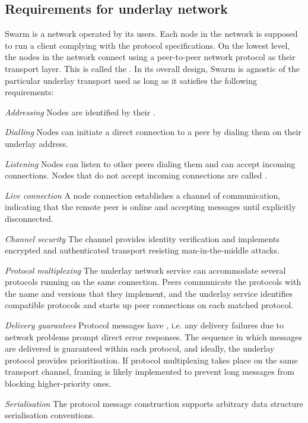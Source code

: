\subsection{Requirements for underlay network \statusyellow}\label{sec:underlay-transport} 

\yellow{}

Swarm is a network operated by its users. Each node in the network is supposed to run a client complying with the protocol specifications. On the lowest level, the nodes in the network connect using a peer-to-peer network protocol as their transport layer. This is called the . 
In its overall design, Swarm is agnostic of the particular underlay transport used as long as it satisfies the following requirements:

\begin{labelledlist}
    \item[\emph{Addressing}] Nodes are identified by their .
    \item[\emph{Dialling}] Nodes can initiate a direct connection to a peer by dialing them on their underlay address.
    \item[\emph{Listening}] Nodes can listen to other peers dialing them and can accept incoming connections. Nodes that do not accept incoming connections are called .
    \item[\emph{Live connection}] A node connection establishes a channel of communication, indicating that the remote peer is online and accepting messages until explicitly disconnected.
    \item[\emph{Channel security}] 
    The channel provides identity verification and implements encrypted and authenticated transport resisting man-in-the-middle attacks.
    \item[\emph{Protocol multiplexing}] 
    The underlay network service can accommodate several protocols running on the same connection. Peers communicate the protocols with the name and versions that they implement, and the underlay service identifies compatible protocols and starts up peer connections on each matched protocol. 
    \item[\emph{Delivery guarantees}] 
    Protocol messages have , i.e. any delivery failures due to network problems prompt direct error responses. 
    The sequence in which messages are delivered is guaranteed within each protocol, and ideally, the underlay protocol provides prioritisation. 
    If protocol multiplexing takes place on the same transport channel, framing is likely implemented to prevent long messages from blocking higher-priority ones.
    \item[\emph{Serialisation}] 
    The protocol message construction supports arbitrary data structure serialisation conventions.
\end{labelledlist}

